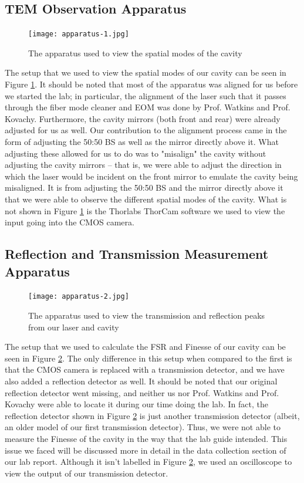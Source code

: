 \documentclass[twocolumn,amsmath,amssymb,pra]{revtex4-2}
\begin{document}
\subsection{TEM Observation Apparatus}
\begin{figure}[htbp]
    \centering
    \texttt{[image: apparatus-1.jpg]}
    \caption{The apparatus used to view the spatial modes of the cavity}
    \label{fig:app_1}
\end{figure}



The setup that we used to view the spatial modes of our cavity can be seen in Figure \ref{fig:app_1}.
It should be noted that most of the apparatus was aligned for us before we started the lab; in particular, the alignment of the laser such that it passes through the fiber mode cleaner and EOM was done by Prof. Watkins and Prof. Kovachy. Furthermore, the cavity mirrors (both front and rear) were already adjusted for us as well. Our contribution to the alignment process came in the form of adjusting the 50:50 BS as well as the mirror directly above it. What adjusting these allowed for us to do was to "misalign" the cavity without adjusting the cavity mirrors -- that is, we were able to adjust the direction in which the laser would be incident on the front mirror to emulate the cavity being misaligned. It is from adjusting the 50:50 BS and the mirror directly above it that we were able to observe the different spatial modes of the cavity. What is not shown in Figure \ref{fig:app_1} is the Thorlabs ThorCam software we used to view the input going into the CMOS camera.


\subsection{Reflection and Transmission Measurement Apparatus}
\begin{figure}[htbp]
    \centering
    \texttt{[image: apparatus-2.jpg]}
    \caption{The apparatus used to view the transmission and reflection peaks from our laser and cavity}
    \label{fig:app_2}
\end{figure}
The setup that we used to calculate the FSR and Finesse of our cavity can be seen in Figure \ref{fig:app_2}. The only difference in this setup when compared to the first is that the CMOS camera is replaced with a transmission detector, and we have also added a reflection detector as well. It should be noted that our original reflection detector went missing, and neither us nor Prof. Watkins and Prof. Kovachy were able to locate it during our time doing the lab. In fact, the reflection detector shown in Figure \ref{fig:app_2} is just another transmission detector (albeit, an older model of our first transmission detector). Thus, we were not able to measure the Finesse of the cavity in the way that the lab guide intended. This issue we faced will be discussed more in detail in the data collection section of our lab report. Although it isn't labelled in Figure \ref{fig:app_2}, we used an oscilloscope to view the output of our transmission detector.
\end{document}
